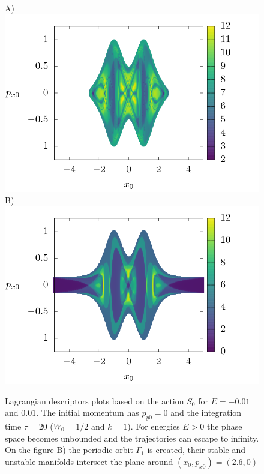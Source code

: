 \documentclass[10pt,aps,onecolumn,superscriptaddress]{revtex4-2}
\begin{document}
\begin{figure}[htbp]
	A)\includegraphics[scale=0.35]{ld_xpx_t20_E-001.png}
	B)\includegraphics[scale=0.35]{ld_xpx_t20_E001.png}	
	\caption{Lagrangian descriptors plots based on the action $S_0$ for $E =-0.01$ and $0.01$. The initial momentum has $p_{y0}=0$ and the integration time $\tau=20$ ($W_0 = 1/2$ and $k = 1$). For energies $E > 0$ the phase space becomes unbounded and the trajectories can escape to infinity. On the figure B) the periodic orbit $\Gamma_1$ is created, their stable and unstable manifolds intersect the plane  around  $(x_0,p_{x0})=(2.6,0)$ }
	\label{fig:ld_x_px}
\end{figure}
\end{document}
